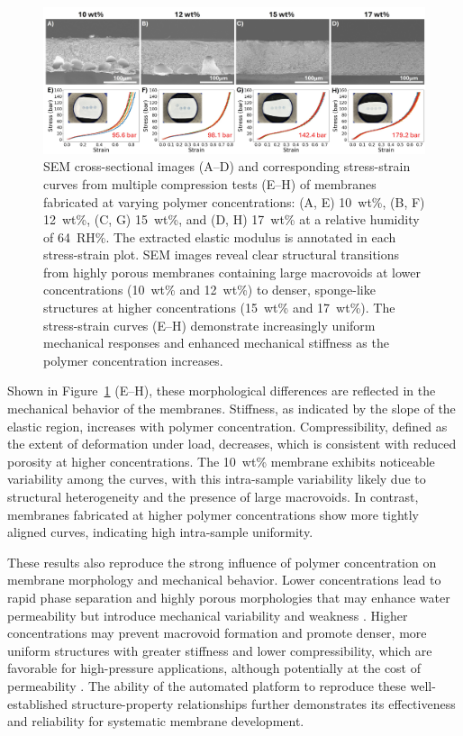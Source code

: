 \documentclass[preprint,12pt,times]{elsarticle}
\begin{document}
\begin{figure}[!ht]
\centering
\includegraphics[width=\linewidth]{concentration.jpg}
\caption{SEM cross-sectional images (A--D) and corresponding stress-strain curves from multiple compression tests (E--H) of membranes fabricated at varying polymer concentrations: (A, E) 10~wt\%, (B, F) 12~wt\%, (C, G) 15~wt\%, and (D, H) 17~wt\% at a relative humidity of 64~RH\%. The extracted elastic modulus is annotated in each stress-strain plot. SEM images reveal clear structural transitions from highly porous membranes containing large macrovoids at lower concentrations (10~wt\% and 12~wt\%) to denser, sponge-like structures at higher concentrations (15~wt\% and 17~wt\%). The stress-strain curves (E--H) demonstrate increasingly uniform mechanical responses and enhanced mechanical stiffness as the polymer concentration increases.}
\label{concentration.jpg}
\end{figure}

Shown in Figure~\ref{concentration.jpg} (E--H), these morphological differences are reflected in the mechanical behavior of the membranes. Stiffness, as indicated by the slope of the elastic region, increases with polymer concentration. Compressibility, defined as the extent of deformation under load, decreases, which is consistent with reduced porosity at higher concentrations. The 10~wt\% membrane exhibits noticeable variability among the curves, with this intra-sample variability likely due to structural heterogeneity and the presence of large macrovoids. In contrast, membranes fabricated at higher polymer concentrations show more tightly aligned curves, indicating high intra-sample uniformity.

These results also reproduce the strong influence of polymer concentration on membrane morphology and mechanical behavior. Lower concentrations lead to rapid phase separation and highly porous morphologies that may enhance water permeability but introduce mechanical variability and weakness \cite{Tan2019}. Higher concentrations may prevent macrovoid formation and promote denser, more uniform structures with greater stiffness and lower compressibility, which are favorable for high-pressure applications, although potentially at the cost of permeability \cite{Tan2019}. The ability of the automated platform to reproduce these well-established structure-property relationships further demonstrates its effectiveness and reliability for systematic membrane development. 
\end{document}
